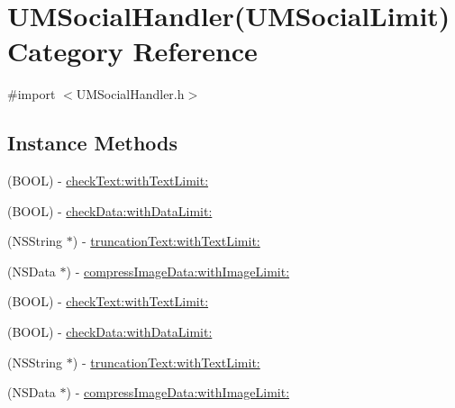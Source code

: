 \hypertarget{category_u_m_social_handler_07_u_m_social_limit_08}{}\section{U\+M\+Social\+Handler(U\+M\+Social\+Limit) Category Reference}
\label{category_u_m_social_handler_07_u_m_social_limit_08}


{\ttfamily \#import $<$U\+M\+Social\+Handler.\+h$>$}

\subsection*{Instance Methods}
\begin{DoxyCompactItemize}
\item 
(B\+O\+OL) -\/ \mbox{\hyperlink{category_u_m_social_handler_07_u_m_social_limit_08_a50a70e47f3feb853f947b55aebf3dde2}{check\+Text\+:with\+Text\+Limit\+:}}
\item 
(B\+O\+OL) -\/ \mbox{\hyperlink{category_u_m_social_handler_07_u_m_social_limit_08_aa40a617ff5de296f940d1bb9de9ca9d6}{check\+Data\+:with\+Data\+Limit\+:}}
\item 
(N\+S\+String $\ast$) -\/ \mbox{\hyperlink{category_u_m_social_handler_07_u_m_social_limit_08_ae19a28003b6af6039dc68c0b465386c0}{truncation\+Text\+:with\+Text\+Limit\+:}}
\item 
(N\+S\+Data $\ast$) -\/ \mbox{\hyperlink{category_u_m_social_handler_07_u_m_social_limit_08_a240f1107abc2ef1e2d139535551a4f36}{compress\+Image\+Data\+:with\+Image\+Limit\+:}}
\item 
(B\+O\+OL) -\/ \mbox{\hyperlink{category_u_m_social_handler_07_u_m_social_limit_08_a50a70e47f3feb853f947b55aebf3dde2}{check\+Text\+:with\+Text\+Limit\+:}}
\item 
(B\+O\+OL) -\/ \mbox{\hyperlink{category_u_m_social_handler_07_u_m_social_limit_08_aa40a617ff5de296f940d1bb9de9ca9d6}{check\+Data\+:with\+Data\+Limit\+:}}
\item 
(N\+S\+String $\ast$) -\/ \mbox{\hyperlink{category_u_m_social_handler_07_u_m_social_limit_08_ae19a28003b6af6039dc68c0b465386c0}{truncation\+Text\+:with\+Text\+Limit\+:}}
\item 
(N\+S\+Data $\ast$) -\/ \mbox{\hyperlink{category_u_m_social_handler_07_u_m_social_limit_08_a240f1107abc2ef1e2d139535551a4f36}{compress\+Image\+Data\+:with\+Image\+Limit\+:}}
\end{DoxyCompactItemize}



